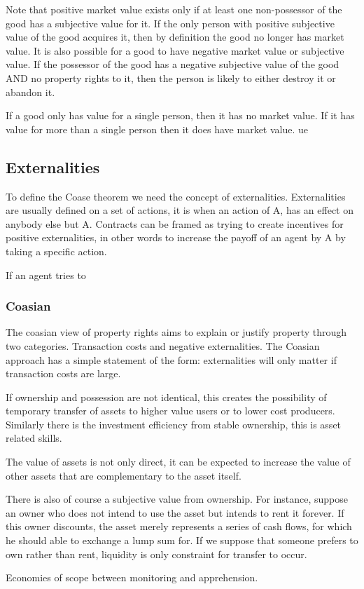 \documentclass[12pt]{article}
\numberwithin{equation}{section}
\begin{document}
Note that positive market value exists only if at least one non-possessor of the good has a subjective value for it. If the only person with positive subjective value of the good acquires it, then by definition the good no longer has market value. It is also possible for a good to have negative market value or subjective value. If the possessor of the good has a negative subjective value of the good AND no property rights to it, then the person is likely to either destroy it or abandon it. 

If a good only has value for a single person, then it has no market value. If it has value for more than a single person then it does have market value. ue 

\subsection{Externalities}

To define the Coase theorem we need the concept of externalities. Externalities are usually defined on a set of actions, it is when an action of A, has an effect on anybody else but A. Contracts can be framed as trying to create incentives for positive externalities, in other words to increase the payoff of an agent by A by taking a specific action.  

If an agent tries to 

\subsubsection{Coasian}




The coasian view of property rights aims to explain or justify property through two categories. Transaction costs and negative externalities. The Coasian approach has a simple statement of the form: externalities will only matter if transaction costs are large. 

If ownership and possession are not identical, this creates the possibility of temporary transfer of assets to higher value users or to lower cost producers. Similarly there is the investment efficiency from stable ownership, this is asset related skills.

The value of assets is not only direct, it can be expected to increase the value of other assets that are complementary to the asset itself.  

There is also of course a subjective value from ownership. For instance, suppose an owner who does not intend to use the asset but intends to rent it forever. If this owner discounts, the asset merely represents a series of cash flows, for which he should able to exchange a lump sum for. If we suppose that someone prefers to own rather than rent, liquidity is only constraint for transfer to occur. 

Economies of scope between monitoring and apprehension. 


\end{document}
